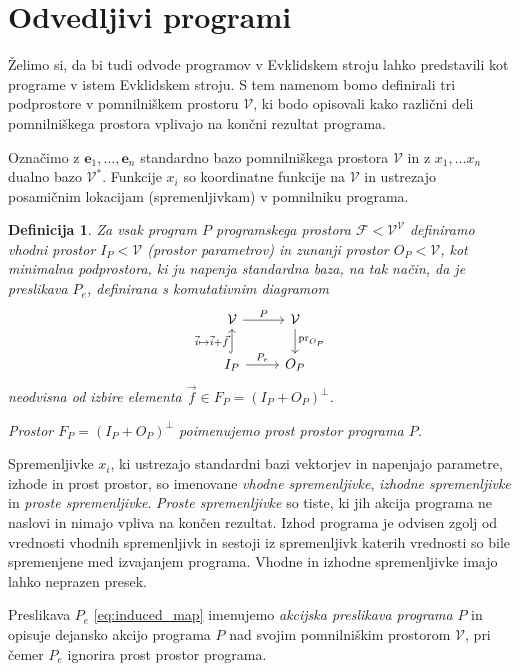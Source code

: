 \documentclass[a4paper, 12pt]{book}
\newcommand{\VV}{\mathcal{V}}
\newcommand{\e}{\mathbf{e}}
\newcommand{\F}{\mathcal{F}}
\newtheorem{definicija}{Definicija}[chapter]
\begin{document}
\section{Odvedljivi programi}

Želimo si, da bi tudi odvode programov v Evklidskem stroju lahko predstavili kot programe v istem Evklidskem stroju. S tem namenom bomo definirali tri podprostore v pomnilniškem prostoru $\VV$, ki bodo opisovali kako različni deli pomnilniškega prostora vplivajo na končni rezultat programa.

Označimo z $\e_1,\ldots, \e_n$ standardno bazo pomnilniškega prostora $\VV$ in z $x_1,\ldots x_n$ dualno bazo $\VV^*$. Funkcije $x_i$ so koordinatne funkcije na $\VV$ in ustrezajo posamičnim lokacijam (spremenljivkam) v pomnilniku programa.
\begin{definicija}
Za vsak program $P$ programskega prostora $\F<\VV^\VV$ definiramo
\emph{vhodni prostor} $I_P<\VV$ (prostor parametrov) in
\emph{zunanji prostor} $O_P<\VV$,
kot minimalna podprostora, ki ju napenja standardna baza, na tak način, da je preslikava  $P_e$, definirana s komutativnim diagramom
\begin{equation} 
    \label{eq:induced_map}
\begin{tikzcd}
  \VV \arrow{r}{P} & 
  \VV \arrow{d}{\mathrm{pr}_{O_P}}\\
  I_P \arrow[hook]{u}{\vec{i}\mapsto \vec{i}+\vec{f}} 
  \arrow{r}{P_e}& O_P
\end{tikzcd}
  \end{equation}
neodvisna od izbire elementa $\vec{f}\in F_P=(I_P+O_P)^\perp$.

Prostor $F_P=(I_P+O_P)^\perp$ poimenujemo \emph{prost prostor} programa $P$.
\end{definicija}

Spremenljivke $x_i$, ki ustrezajo standardni bazi vektorjev in napenjajo parametre, izhode in prost prostor, so imenovane \emph{vhodne spremenljivke}, \emph{izhodne spremenljivke} in \emph{proste spremenljivke}. \emph{Proste spremenljivke} so tiste, ki jih akcija programa ne naslovi in nimajo vpliva na končen rezultat. Izhod programa je odvisen zgolj od vrednosti vhodnih spremenljivk in sestoji iz spremenljivk katerih vrednosti so bile spremenjene med izvajanjem programa. Vhodne in izhodne spremenljivke imajo lahko neprazen presek.

Preslikava $P_e$ \eqref{eq:induced_map} imenujemo \emph{akcijska preslikava programa} $P$ in opisuje dejansko akcijo programa $P$ nad svojim pomnilniškim prostorom $\VV$, pri čemer $P_e$ ignorira prost prostor programa.
\end{document}
